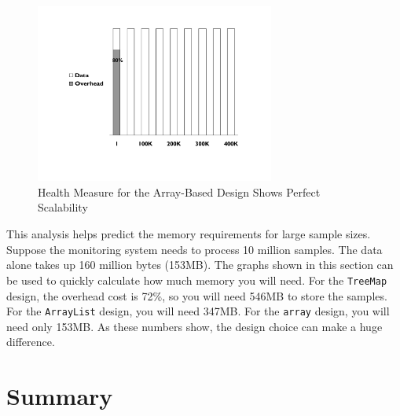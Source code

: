 \begin{figure}
  \centering
  \includegraphics[width=0.7\textwidth]{part1/Figures/memoryhealth/scalable-health-array}
  \caption{Health Measure for the Array-Based Design Shows Perfect Scalability}
  \label{fig:scalable-health-array}
\end{figure}

This analysis helps predict the memory requirements for large sample sizes. Suppose the monitoring system needs to process 10 million samples. The data alone takes up 160 million bytes (153MB).  The graphs shown in this section can be used to quickly calculate how much memory you will need. For the \texttt{TreeMap} design, the overhead cost is 72\%, so you will need 546MB to store the samples. For the \texttt{ArrayList} design, you will need 347MB. For the \texttt{array} design, you will need only 153MB. As these numbers show, the design choice can make a huge difference.

\section{Summary}

